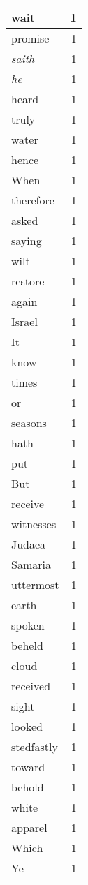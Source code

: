 \begin{center}
\begin{longtable}{l|r}
wait & 1 \\ \hline
promise & 1 \\ \hline
\emph{saith} & 1 \\ \hline
\emph{he} & 1 \\ \hline
heard & 1 \\ \hline
truly & 1 \\ \hline
water & 1 \\ \hline
hence & 1 \\ \hline
When & 1 \\ \hline
therefore & 1 \\ \hline
asked & 1 \\ \hline
saying & 1 \\ \hline
wilt & 1 \\ \hline
restore & 1 \\ \hline
again & 1 \\ \hline
Israel & 1 \\ \hline
It & 1 \\ \hline
know & 1 \\ \hline
times & 1 \\ \hline
or & 1 \\ \hline
seasons & 1 \\ \hline
hath & 1 \\ \hline
put & 1 \\ \hline
But & 1 \\ \hline
receive & 1 \\ \hline
witnesses & 1 \\ \hline
Judaea & 1 \\ \hline
Samaria & 1 \\ \hline
uttermost & 1 \\ \hline
earth & 1 \\ \hline
spoken & 1 \\ \hline
beheld & 1 \\ \hline
cloud & 1 \\ \hline
received & 1 \\ \hline
sight & 1 \\ \hline
looked & 1 \\ \hline
stedfastly & 1 \\ \hline
toward & 1 \\ \hline
behold & 1 \\ \hline
white & 1 \\ \hline
apparel & 1 \\ \hline
Which & 1 \\ \hline
Ye & 1 \\ \hline

\end{longtable}
\end{center}
